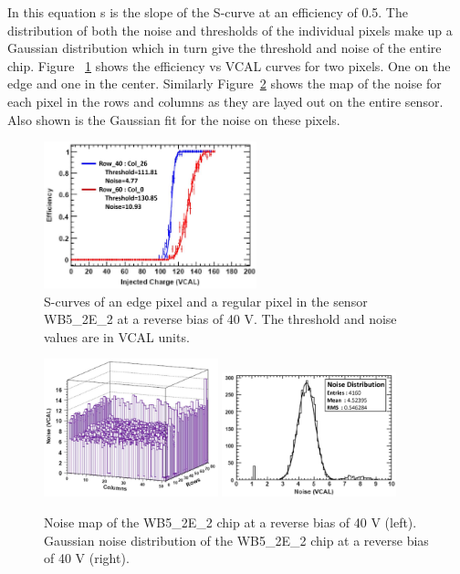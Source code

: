 In this equation s is the slope of the S-curve at an efficiency of 0.5. The distribution of both the noise and thresholds of the individual pixels make up a Gaussian distribution which in turn give the threshold and noise of the entire chip. Figure ~\ref{fig:eff_3D} shows the efficiency vs VCAL curves for two pixels.  One on the edge and one in the center. Similarly Figure~\ref{fig:noise} shows the map of the noise for each pixel in the rows and columns as they are layed out on the entire sensor.  Also shown is the Gaussian fit for the noise on these pixels.


\begin{figure}[htb!]
\begin{center}
\centerline{
\includegraphics[width=0.55\textwidth]{3D/efficiency.pdf}
}
\caption{S-curves of an edge pixel and a regular pixel in the sensor WB5\_2E\_2
at a reverse bias of 40 V. The threshold and noise values are in VCAL units.~\cite{5734879} }
\label{fig:eff_3D}
\end{center}
\end{figure}

\begin{figure}[htb!]
\begin{center}
\centerline{
\includegraphics[width=0.45\textwidth]{3D/map.pdf}
\includegraphics[width=0.45\textwidth]{3D/noise.pdf}
}
\caption{Noise map of the WB5\_2E\_2 chip at a reverse bias of 40 V (left). Gaussian noise distribution of the WB5\_2E\_2 chip at a reverse bias of 40 V (right). ~\cite{5734879} }
\label{fig:noise}
\end{center}
\end{figure}

